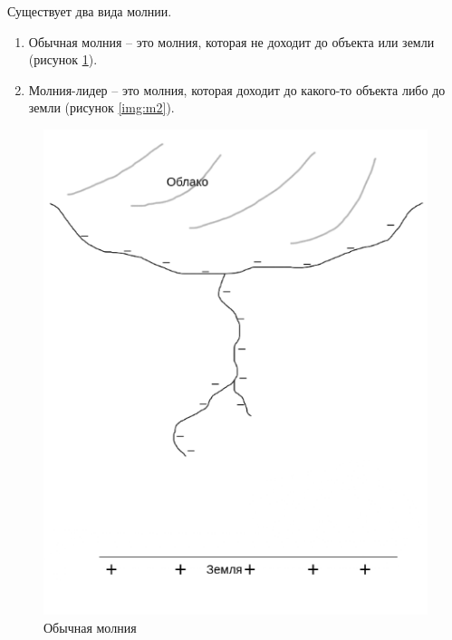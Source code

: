 Существует два вида молнии.
\begin{enumerate}
	\item Обычная молния -- это молния, которая не доходит до объекта или земли (рисунок \ref{img:m1}).
	\item Молния-лидер -- это молния, которая доходит до какого-то объекта либо до земли (рисунок \ref{img:m2}). 
\end{enumerate}

\begin{figure}[H]
	\begin{center}
		\includegraphics[scale=0.48]{img/m1.png}
	\end{center}
	\captionsetup{justification=centering}
	\caption{Обычная молния}
	\label{img:m1}
\end{figure}

